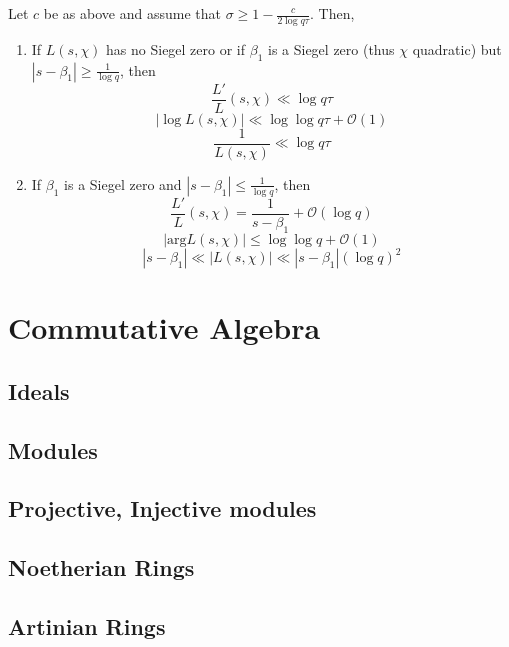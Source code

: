 \documentclass[oneside, 12pt, ]{scrbook}
\theoremstyle{theorem}
\begin{document}
\begin{proposition}
Let $c$ be as above and assume that $\sigma \geq 1 - \frac{c}{2 \log q \tau}$. Then, 
\begin{enumerate}
\item If $L(s,\chi)$ has no Siegel zero or if $\beta_{1}$ is a Siegel zero (thus $\chi$ quadratic) but $|s- \beta_{1}| \geq \frac{1}{\log q}$, then $$\frac{L'}{L}(s, \chi) \ll \log q \tau$$ $$|\log L(s,\chi)| \ll \log \log q\tau + \mathcal{O}(1)$$ $$\frac{1}{L(s,\chi)} \ll \log q\tau$$
\item If $\beta_{1}$ is a Siegel zero and $|s - \beta_{1}| \le \frac{1}{\log q}$, then $$\frac{L'}{L}(s, \chi) = \frac{1}{s- \beta_{1}} + \mathcal{O}(\log q)$$ $$|\mathrm{arg} L(s,\chi)| \le \log \log q + \mathcal{O}(1)$$ $$|s- \beta_{1}| \ll |L(s,\chi)| \ll |s-\beta_{1}|(\log q)^2$$
\end{enumerate}
\end{proposition}


















\part{Commutative Algebra}

\chapter{Ideals}

\chapter{Modules}

\chapter{Projective, Injective modules}

\chapter{Noetherian Rings}

\chapter{Artinian Rings}
\end{document}
